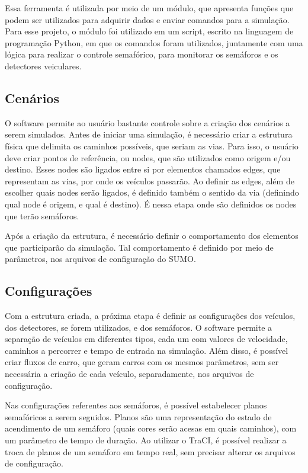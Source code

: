 Essa ferramenta é utilizada por meio de um módulo, que apresenta funções que podem ser utilizados para adquirir dados e enviar comandos para a simulação. Para esse projeto, o módulo foi utilizado em um script, escrito na linguagem de programação Python, em que os comandos foram utilizados, juntamente com uma lógica para realizar o controle semafórico, para monitorar os semáforos e os detectores veiculares.

\subsection{Cenários}

O software permite ao usuário bastante controle sobre a criação dos cenários a serem simulados. Antes de iniciar uma simulação, é necessário criar a estrutura física que delimita os caminhos possíveis, que seriam as vias. Para isso, o usuário deve criar pontos de referência, ou nodes, que são utilizados como origem e/ou destino. Esses nodes são ligados entre si por elementos chamados edges, que representam as vias, por onde os veículos passarão. Ao definir as edges, além de escolher quais nodes serão ligados, é definido também o sentido da via (definindo qual node é origem, e qual é destino). É nessa etapa onde são definidos os nodes que terão semáforos.

Após a criação da estrutura, é necessário definir o comportamento dos elementos que participarão da simulação. Tal comportamento é definido por meio de parâmetros, nos arquivos de configuração do SUMO.

\subsection{Configurações}

Com a estrutura criada, a próxima etapa é definir as configurações dos veículos, dos detectores, se forem utilizados, e dos semáforos. O software permite a separação de veículos em diferentes tipos, cada um com valores de velocidade, caminhos a percorrer e tempo de entrada na simulação. Além disso, é possível criar fluxos de carro, que geram carros com os mesmos parâmetros, sem ser necessária a criação de cada veículo, separadamente, nos arquivos de configuração.

Nas configurações referentes aos semáforos, é possível estabelecer planos semafóricos a serem seguidos. Planos são uma representação do estado de acendimento de um semáforo (quais cores serão acesas em quais caminhos), com um parâmetro de tempo de duração. Ao utilizar o TraCI, é possível realizar a troca de planos de um semáforo em tempo real, sem precisar alterar os arquivos de configuração.

